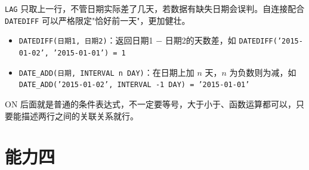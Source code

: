 \begin{note}
\texttt{LAG} 只取上一行，不管日期实际差了几天，若数据有缺失日期会误判。自连接配合 \texttt{DATEDIFF} 可以严格限定"恰好前一天"，更加健壮。
\end{note}
\begin{itemize}
    \item \texttt{DATEDIFF(日期1, 日期2)}：返回日期1 $-$ 日期2的天数差，如 \texttt{DATEDIFF('2015-01-02', '2015-01-01') = 1}
    \item \texttt{DATE\_ADD(日期, INTERVAL n DAY)}：在日期上加 $n$ 天，$n$ 为负数则为减，如 \texttt{DATE\_ADD('2015-01-02', INTERVAL -1 DAY) = '2015-01-01'}
\end{itemize}
\begin{dxtips}
 ON 后面就是普通的条件表达式，不一定要等号，大于小于、函数运算都可以，只要能描述两行之间的关联关系就行。
\end{dxtips}
\chapter{能力四}
